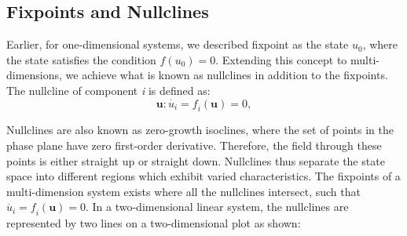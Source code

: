 \subsection{Fixpoints and Nullclines}
Earlier, for one-dimensional systems, we described fixpoint as the state $ \textit{u}_{0} $, where the state satisfies the condition $ \textit{f}(\textit{u}_{0})=0 $. Extending this concept to multi-dimensions, we achieve what is known as nullclines in addition to the fixpoints. The nullcline of component \textit{i} is defined as:
\begin{equation}
\mathbf{u}:\dot{\textit{u}_{i}}=\textit{f}_{i}(\mathbf{u})=0,
\end{equation}

Nullclines are also known as zero-growth isoclines, where the set of points in the phase plane have zero first-order derivative. Therefore, the field through these points is either straight up or straight down. Nullclines thus separate the state space into different regions which exhibit varied characteristics. The fixpoints of a multi-dimension system exists where all the nullclines intersect, such that $ \dot{\textit{u}_{i}}=\textit{f}_{i}(\mathbf{u})=0 $. In a two-dimensional linear system, the nullclines are represented by two lines on a two-dimensional plot as shown:


